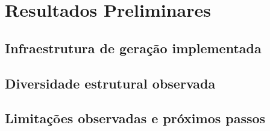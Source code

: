 \chapter{Resultados Preliminares}
\label{cap:resultados-preliminares}


\section{Infraestrutura de geração implementada}
\label{sec:resultados-infraestrutura}


\section{Diversidade estrutural observada}
\label{sec:resultados-diversidade}


\section{Limitações observadas e próximos passos}
\label{sec:resultados-limitacoes}

